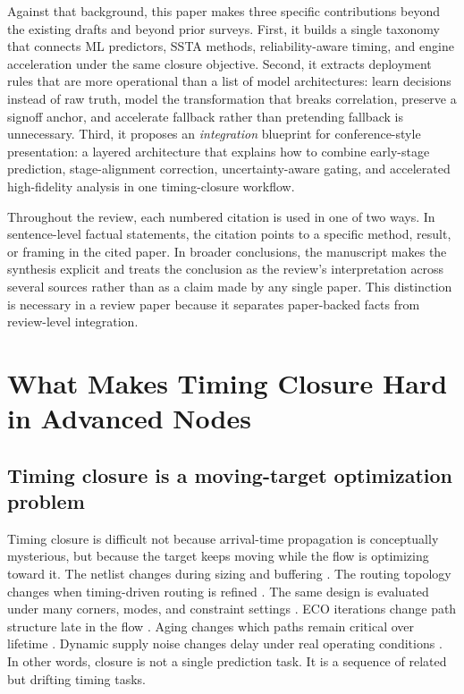 \documentclass[num-refs]{wiley-article}
\begin{document}
  Against that background, this paper makes three specific contributions beyond the existing drafts and beyond prior surveys. First, it builds a single taxonomy that connects ML predictors, SSTA methods, reliability-aware timing, and engine acceleration under the same closure objective. Second, it extracts deployment rules that are more operational than a list of model architectures: learn decisions instead of raw truth, model the transformation that breaks correlation, preserve a signoff anchor, and accelerate fallback rather than pretending fallback is unnecessary. Third, it proposes an \emph{integration} blueprint for conference-style presentation: a layered architecture that explains how to combine early-stage prediction, stage-alignment correction, uncertainty-aware gating, and accelerated high-fidelity analysis in one timing-closure workflow.


  Throughout the review, each numbered citation is used in one of two ways. In sentence-level factual statements, the citation points to a specific method, result, or framing in the cited paper. In broader conclusions, the manuscript makes the synthesis explicit and treats the conclusion as the review's interpretation across several sources rather than as a claim made by any single paper. This distinction is necessary in a review paper because it separates paper-backed facts from review-level integration.


  \section{What Makes Timing Closure Hard in Advanced Nodes}

  \subsection{Timing closure is a moving-target optimization problem}

  Timing closure is difficult not because arrival-time propagation is conceptually mysterious, but because the target keeps moving while the flow is optimizing toward it. The netlist changes during sizing and buffering \cite{ref1}. The routing topology changes when timing-driven routing is refined \cite{ref7}. The same design is evaluated under many corners, modes, and constraint settings \cite{ref16}. ECO iterations change path structure late in the flow \cite{ref19}. Aging changes which paths remain critical over lifetime \cite{ref23}. Dynamic supply noise changes delay under real operating conditions \cite{ref12}. In other words, closure is not a single prediction task. It is a sequence of related but drifting timing tasks.
\end{document}
